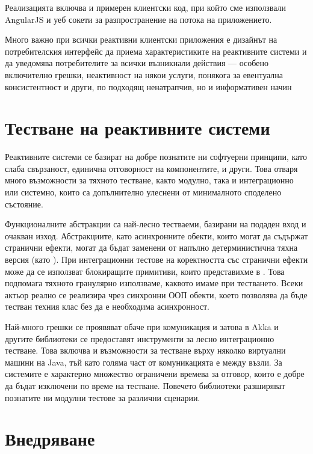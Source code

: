 Реализацията включва и примерен клиентски код, при който сме използвали AngularJS и уеб сокети за разпространение на  потока на приложението.

Много важно при всички реактивни клиентски приложения е дизайнът на потребителския интерфейс да приема характеристиките на реактивните системи и да уведомява потребителите за всички възникнали действия — особено включително грешки, неактивност на някои услуги, понякога за евентуална консистентност и други, по подходящ ненатрапчив, но и информативен начин

\section{Тестване на реактивните системи}

Реактивните системи се базират на добре познатите ни софтуерни принципи, като слаба свързаност, единична отговорност на компонентите, и други. Това отваря много възможности за тяхното тестване, както модулно, така и интеграционно или системно, които са допълнително улеснени от минималното споделено състояние.

Функционалните абстракции са най-лесно тестваеми, базирани на подаден вход и очакван изход. Абстракциите, като асинхронните  обекти, които могат да съдържат странични ефекти, могат да бъдат заменени от напълно детерминистична тяхна версия (като ). При интеграционни тестове на коректността със странични ефекти може да се използват блокиращите примитиви, които представихме в . Това подпомага тяхното гранулярно използваме, каквото имаме при тестването. Всеки актьор реално се реализира чрез синхронни ООП обекти, което позволява да бъде тестван техния клас без да е необходима асинхронност.

Най-много грешки се проявяват обаче при комуникация и затова в Akka и другите библиотеки се предоставят инструменти за лесно интеграционно тестване. Това включва и възможности за тестване върху няколко виртуални машини на Java, тъй като голяма част от комуникацията е между възли. За системите е характерно множество ограничени времева за отговор, които е добре да бъдат изключени по време на тестване. Повечето библиотеки разширяват познатите ни модулни тестове за различни сценарии.

\section{Внедряване}


